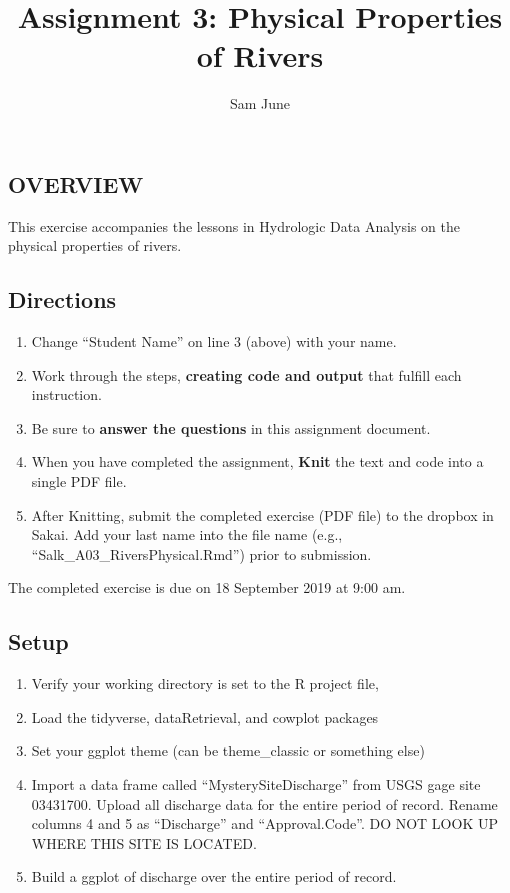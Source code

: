 \documentclass[]{article}
\title{Assignment 3: Physical Properties of Rivers}
\author{Sam June}
\date{}
\providecommand{\tightlist}{%
  \setlength{\itemsep}{0pt}\setlength{\parskip}{0pt}}
\begin{document}
\maketitle

\hypertarget{overview}{%
\subsection{OVERVIEW}\label{overview}}

This exercise accompanies the lessons in Hydrologic Data Analysis on the
physical properties of rivers.

\hypertarget{directions}{%
\subsection{Directions}\label{directions}}

\begin{enumerate}
\def\labelenumi{\arabic{enumi}.}
\tightlist
\item
  Change ``Student Name'' on line 3 (above) with your name.
\item
  Work through the steps, \textbf{creating code and output} that fulfill
  each instruction.
\item
  Be sure to \textbf{answer the questions} in this assignment document.
\item
  When you have completed the assignment, \textbf{Knit} the text and
  code into a single PDF file.
\item
  After Knitting, submit the completed exercise (PDF file) to the
  dropbox in Sakai. Add your last name into the file name (e.g.,
  ``Salk\_A03\_RiversPhysical.Rmd'') prior to submission.
\end{enumerate}

The completed exercise is due on 18 September 2019 at 9:00 am.

\hypertarget{setup}{%
\subsection{Setup}\label{setup}}

\begin{enumerate}
\def\labelenumi{\arabic{enumi}.}
\tightlist
\item
  Verify your working directory is set to the R project file,
\item
  Load the tidyverse, dataRetrieval, and cowplot packages
\item
  Set your ggplot theme (can be theme\_classic or something else)
\item
  Import a data frame called ``MysterySiteDischarge'' from USGS gage
  site 03431700. Upload all discharge data for the entire period of
  record. Rename columns 4 and 5 as ``Discharge'' and ``Approval.Code''.
  DO NOT LOOK UP WHERE THIS SITE IS LOCATED.
\item
  Build a ggplot of discharge over the entire period of record.
\end{enumerate}
\end{document}
